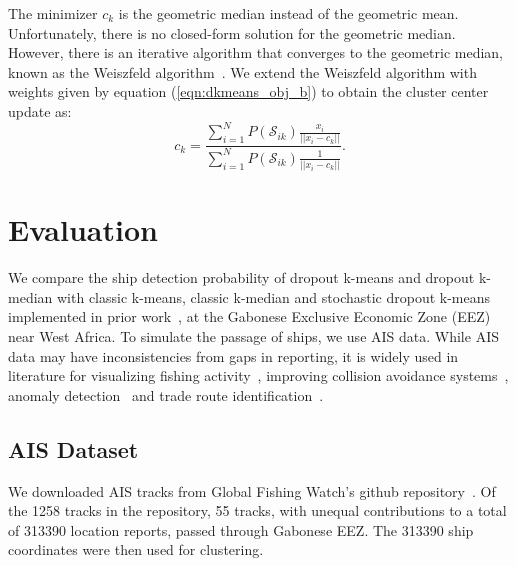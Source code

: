 \documentclass{article}
\begin{document}
The minimizer $c_k$ is the geometric median instead of the geometric mean. Unfortunately, there is no closed-form solution for the geometric median. However, there is an iterative algorithm that converges to the geometric median, known as the Weiszfeld algorithm~\cite{weiszfeld1937geometricmedian}. We extend the Weiszfeld algorithm with weights given by equation (\ref{eqn:dkmeans_obj_b}) to obtain the cluster center update as:
\begin{equation}
c_k = \frac{\sum_{i=1}^N P(\mathcal{S}_{ik})\frac{x_i}{||x_i-c_k||}}{\sum_{i=1}^NP(\mathcal{S}_{ik})\frac{1}{||x_i-c_k||}}.
\end{equation}

\section{Evaluation}\label{S:evaluation}

We compare the ship detection probability of dropout k-means and dropout k-median with classic k-means, classic k-median and stochastic dropout k-means implemented in prior work~\cite{zhang2016_dropoutkmeans}, at the Gabonese Exclusive Economic Zone (EEZ) near West Africa. To simulate the passage of ships, we use AIS data. While AIS data may have inconsistencies from gaps in reporting, it is widely used in literature for visualizing fishing activity~\cite{kroodsma2018_gfw}, improving collision avoidance systems~\cite{zhang2015_nearmiss, gao2018_lstmrnn}, anomaly detection~\cite{laxhammer2008_anomalydet} and trade route identification~\cite{spiliopoulos2017_traderouteid}. 

\subsection{AIS Dataset}

 We downloaded AIS tracks from Global Fishing Watch's github repository~\cite{gfw_github}. Of the 1258 tracks in the repository, 55 tracks, with unequal contributions to a total of 313390 location reports, passed through Gabonese EEZ. The 313390 ship coordinates were then used for clustering.
 
\end{document}
